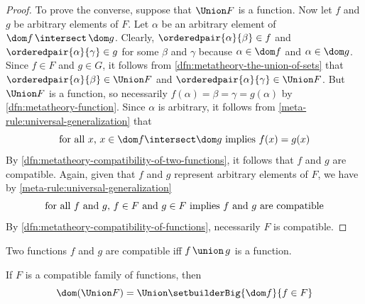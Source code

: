 \begin{proof}
    \vspace{0.3cm}
    \noindent
    To prove the converse, suppose that \( \Union F \) is a function.
    Now let \( f \) and \( g \) be arbitrary elements of \( F \).
    Let \( \alpha \) be an arbitrary element of \( \dom f \,{\intersect}\, \dom g \).
    Clearly, \( \orderedpair{\alpha}{\beta} \in f \) and \( \orderedpair{\alpha}{\gamma} \in g \) for some \( \beta \) and \( \gamma \)
    because \( \alpha \in \dom f \) and \( \alpha \in \dom g \).
    Since \( f \in F \) and \( g \in G \), it follows from \cref{dfn:metatheory-the-union-of-sets} that
    \( \orderedpair{\alpha}{\beta} \in \Union F \) and \( \orderedpair{\alpha}{\gamma} \in \Union F \).
    But \( \Union F \) is a function, so necessarily \( f(\alpha) = \beta = \gamma = g(\alpha) \) by \cref{dfn:metatheory-function}.
    Since \( \alpha \) is arbitrary, it follows from \cref{meta-rule:universal-generalization} that
    \begin{equation*}
        \text{for all \( x \), \( x \in \dom f \intersect \dom g \) implies \( f(x) = g(x) \)}
    \end{equation*}
    By \cref{dfn:metatheory-compatibility-of-two-functions}, it follows that \( f \) and \( g \) are compatible.
    Again, given that \( f \) and \( g \) represent arbitrary elements of \( F \), we have by \cref{meta-rule:universal-generalization}
    \begin{equation*}
        \text{for all \( f \) and \( g \), \( f \in F \) and \( g \in F \) implies \( f \) and \( g \) are compatible}
    \end{equation*}
    By \cref{dfn:metatheory-compatibility-of-functions}, necessarily \( F \) is compatible.
\end{proof}

\begin{cor}
     \label{cor:metatheory-two-functions-are-compatible-iff-their-union-is-a-function}
    Two functions \( f \) and \( g \) are compatible iff \( f \,{\union}\, g \) is a function. 
\end{cor}

\begin{thm}
     \label{thm:metatheory-the-domain-of-a-compatible-family-of-functions-is-the-union-of-the-domains-of-each-function-in-the-family}
    If \( F \) is a compatible family of functions, then
    \begin{equation*}
        \dom \mleft( \Union F \mright) = \Union \setbuilderBig{\dom f}{f \in F}
    \end{equation*}
\end{thm}

